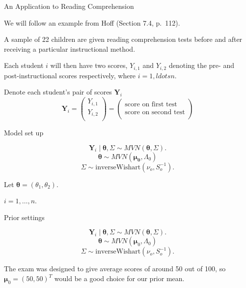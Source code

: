 \documentclass[
  ignorenonframetext,
]{beamer}
\newcommand{\btheta}{{\bm\theta}}
\begin{document}
\begin{frame}{An Application to Reading Comprehension}
\protect\hypertarget{an-application-to-reading-comprehension}{}

We will follow an example from Hoff (Section 7.4, p.~112).

A sample of 22 children are given reading comprehension tests before and
after receiving a particular instructional method.

Each student \(i\) will then have two scores, \(Y_{i,1}\) and
\(Y_{i,2}\) denoting the pre- and post-instructional scores
respectively, where \(i=1,ldots n.\)

Denote each student's pair of scores \(\bm{Y}_i\) \[
\bm{Y}_{i} = \left( \begin{array}{c}
Y_{i,1}\\
Y_{i,2}\\
\end{array} \right) 
= \left( \begin{array}{c}
\text{score on first test}\\
\text{score on second test}\\
\end{array} \right)
\]

\end{frame}

\begin{frame}{Model set up}
\protect\hypertarget{model-set-up}{}

\[\bm{Y}_i \mid \btheta, \Sigma \sim MVN(\bm{\theta}, \Sigma).\]
\[ \bm{\theta} \sim MVN(\bm{\mu_0}, \Lambda_0)\]
\[ \Sigma \sim \text{inverseWishart}(\nu_o, S_o^{-1}).\]

Let \(\btheta = (\theta_1, \theta_2).\)

\(i=1,\ldots,n.\)

\end{frame}

\begin{frame}{Prior settings}
\protect\hypertarget{prior-settings}{}

\[\bm{Y}_i \mid \bm{\theta}, \Sigma \sim MVN(\bm{\theta}, \Sigma).\]
\[ \bm{\theta} \sim MVN(\bm{\mu}_0, \Lambda_0)\]
\[ \Sigma \sim \text{inverseWishart}(\nu_o, S_o^{-1}).\]

The exam was designed to give average scores of around 50 out of 100, so
\(\bm{\mu}_0 = (50,50)^T\) would be a good choice for our prior mean.

\end{frame}
\end{document}
